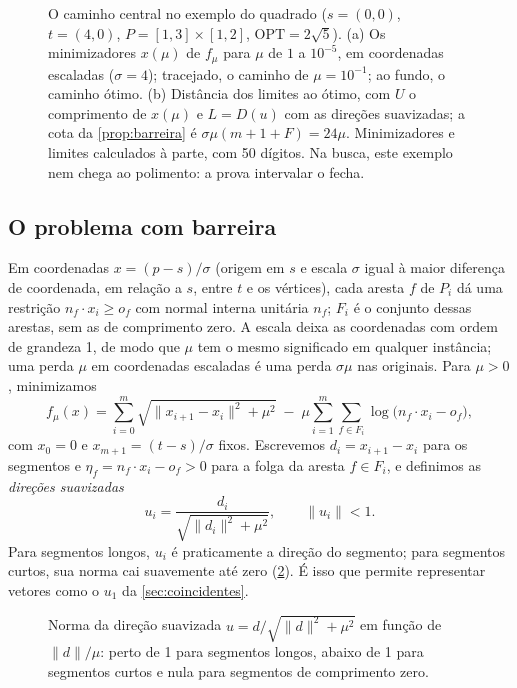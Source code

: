\documentclass[11pt,a4paper]{article}
\theoremstyle{plain}\newtheorem{proposicao}{Proposição}
\theoremstyle{definition}\newtheorem{definicao}{Definição}
\theoremstyle{plain}\newtheorem{teorema}{Teorema}
\newcommand{\norm}[1]{\lVert#1\rVert}
\newcommand{\OPT}{\mathrm{OPT}}
\begin{document}
\begin{figure}[ht]\centering\figcentral
\caption{O caminho central no exemplo do quadrado (\(s=(0,0)\), \(t=(4,0)\), \(P=[1,3]\times[1,2]\), \(\OPT=2\sqrt5\)). (a) Os minimizadores \(x(\mu)\) de \(f_\mu\) para \(\mu\) de \(1\) a \(10^{-5}\), em coordenadas escaladas (\(\sigma=4\)); tracejado, o caminho de \(\mu=10^{-1}\); ao fundo, o caminho ótimo. (b) Distância dos limites ao ótimo, com \(U\) o comprimento de \(x(\mu)\) e \(L=D(u)\) com as direções suavizadas; a cota da \cref{prop:barreira} é \(\sigma\mu(m+1+F)=24\mu\). Minimizadores e limites calculados à parte, com 50 dígitos. Na busca, este exemplo nem chega ao polimento: a prova intervalar o fecha.}\label{fig:central}
\end{figure}

\subsection{O problema com barreira}
Em coordenadas \(x=(p-s)/\sigma\) (origem em \(s\) e escala \(\sigma\) igual à maior diferença de coordenada, em relação a \(s\), entre \(t\) e os vértices), cada aresta \(f\) de \(P_i\) dá uma restrição \(n_f\cdot x_i\ge o_f\) com normal interna unitária \(n_f\); \(F_i\) é o conjunto dessas arestas, sem as de comprimento zero. A escala deixa as coordenadas com ordem de grandeza 1, de modo que \(\mu\) tem o mesmo significado em qualquer instância; uma perda \(\mu\) em coordenadas escaladas é uma perda \(\sigma\mu\) nas originais. Para \(\mu>0\), minimizamos
\begin{equation}\label{eq:barreira}
f_\mu(x)=\sum_{i=0}^m\sqrt{\norm{x_{i+1}-x_i}^2+\mu^2}\;-\;\mu\sum_{i=1}^m\sum_{f\in F_i}\log\bigl(n_f\cdot x_i-o_f\bigr),
\end{equation}
com \(x_0=0\) e \(x_{m+1}=(t-s)/\sigma\) fixos. Escrevemos \(d_i=x_{i+1}-x_i\) para os segmentos e \(\eta_f=n_f\cdot x_i-o_f>0\) para a folga da aresta \(f\in F_i\), e definimos as \emph{direções suavizadas}
\begin{equation}\label{eq:usuave}
u_i=\frac{d_i}{\sqrt{\norm{d_i}^2+\mu^2}},\qquad \norm{u_i}<1 .
\end{equation}
Para segmentos longos, \(u_i\) é praticamente a direção do segmento; para segmentos curtos, sua norma cai suavemente até zero (\cref{fig:norma}). É isso que permite representar vetores como o \(u_1\) da \cref{sec:coincidentes}.

\begin{figure}[ht]\centering\fignorma
\caption{Norma da direção suavizada \(u=d/\sqrt{\norm d^2+\mu^2}\) em função de \(\norm d/\mu\): perto de 1 para segmentos longos, abaixo de 1 para segmentos curtos e nula para segmentos de comprimento zero.}\label{fig:norma}
\end{figure}
\end{document}
